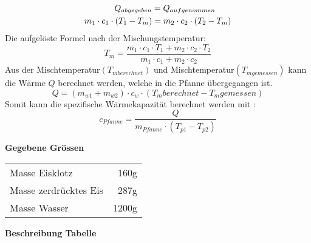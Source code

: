 \documentclass{article}
\begin{document}
\begin{equation}
\begin{split}
 Q_{abgegeben} = Q_{aufgenommen}\hspace{0.655cm}\\
 m_1\cdot c_1\cdot (T_1-T_m)=m_2\cdot c_2\cdot (T_2-T_m)
\end{split}
\end{equation}
Die aufgelöste Formel nach der Mischungstemperatur:
\begin{equation}
	T_m = \frac{m_1\cdot c_1\cdot T_1+m_2\cdot c_2\cdot T_2}{m_1\cdot c_1+m_2\cdot c_2}
\end{equation}
Aus der Mischtemperatur$(T_{mberechnet})$ und Mischtemperatur$(T_{mgemessen})$ kann die Wärme $Q$ berechnet werden, welche in die Pfanne übergegangen ist.
\begin{equation}
 Q = (m_{w1}+m_{w2}) \cdot c_w \cdot (T_m{berechnet}-T_m{gemessen})
\end{equation}
Somit kann die spezifische Wärmekapazität berechnet werden mit :
\begin{equation}
	c_{Pfanne} = \frac{Q}{m_{Pfanne} \cdot (T_{p1}-T_{p2}) }
\end{equation}

\textbf{Gegebene Grössen}\\
\begin{tabular}{l r}
Masse Eisklotz & 160g \\
Masse zerdrücktes Eis & 287g \\
Masse Wasser & 1200g
\end{tabular}
\newpage
\textbf{Beschreibung Tabelle}
\end{document}

